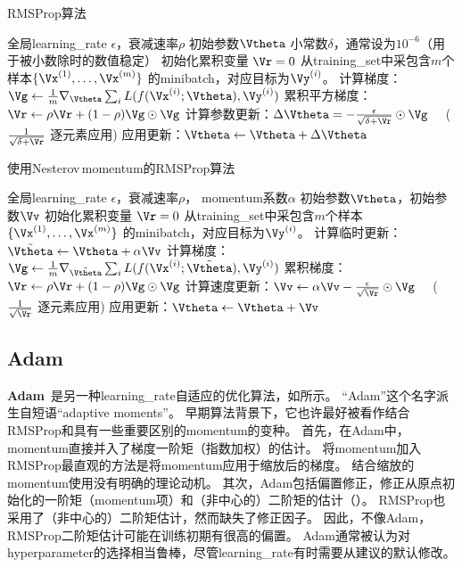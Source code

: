 \begin{algorithm}[ht]
\caption{RMSProp算法}
\label{alg:rms_prop}
\begin{algorithmic}
\REQUIRE 全局\gls{learning_rate} $\epsilon$，衰减速率$\rho$
\REQUIRE  初始参数$\Vtheta$
\REQUIRE 小常数$\delta$，通常设为$10^{-6}$（用于被小数除时的数值稳定）
\STATE 初始化累积变量 $\Vr = 0$
    \STATE 从\gls{training_set}中采包含$m$个样本$\{ \Vx^{(1)},\dots, \Vx^{(m)}\}$ 的\gls{minibatch}，对应目标为$\Vy^{(i)}$。
    \STATE 计算梯度：$\Vg \leftarrow  
         \frac{1}{m} \nabla_{\Vtheta} \sum_i L(f(\Vx^{(i)};\Vtheta),\Vy^{(i)})$ 
    \STATE 累积平方梯度：$\Vr \leftarrow \rho
    \Vr + (1-\rho) \Vg \odot \Vg$
    \STATE 计算参数更新：$\Delta \Vtheta =
    -\frac{\epsilon}{\sqrt{\delta + \Vr}} \odot \Vg$  \ \  ($\frac{1}{\sqrt{\delta + \Vr}}$ 逐元素应用)
    \STATE 应用更新：$\Vtheta \leftarrow \Vtheta + \Delta \Vtheta$
\ENDWHILE
\end{algorithmic}
\end{algorithm}

\begin{algorithm}[ht]
\caption{使用Nesterov\,\gls{momentum}的RMSProp算法}
\label{alg:rms_nesterov}
\begin{algorithmic}
\REQUIRE 全局\gls{learning_rate} $\epsilon$，衰减速率$\rho$， \gls{momentum}系数$\alpha$
\REQUIRE 初始参数$\Vtheta$，初始参数$\Vv$
\STATE 初始化累积变量 $\Vr = 0$
    \STATE 从\gls{training_set}中采包含$m$个样本$\{ \Vx^{(1)},\dots, \Vx^{(m)}\}$ 的\gls{minibatch}，对应目标为$\Vy^{(i)}$。
    \STATE 计算临时更新：$\tilde{\Vtheta} \leftarrow \Vtheta + \alpha \Vv$
    \STATE 计算梯度：$\Vg \leftarrow  
         \frac{1}{m} \nabla_{\tilde{\Vtheta}} \sum_i L(f(\Vx^{(i)};\tilde{\Vtheta}),\Vy^{(i)})$ 
    \STATE  累积梯度：$\Vr \leftarrow \rho
    \Vr + (1-\rho) \Vg \odot \Vg$
    \STATE  计算速度更新：$\Vv \leftarrow \alpha \Vv
    -\frac{\epsilon}{\sqrt{\Vr}} \odot \Vg$ \ \  ($\frac{1}{\sqrt{\Vr}}$ 逐元素应用)
    \STATE 应用更新：$\Vtheta \leftarrow \Vtheta + \Vv$
\ENDWHILE
\end{algorithmic}
\end{algorithm}


\subsection{Adam}
\label{sec:adam}
\textbf{Adam}~\citep{Kingma-Ba-2014}是另一种\gls{learning_rate}自适应的优化算法，如所示。
``Adam''这个名字派生自短语``adaptive moments''。
早期算法背景下，它也许最好被看作结合RMSProp和具有一些重要区别的\gls{momentum}的变种。
首先，在Adam中，\gls{momentum}直接并入了梯度一阶矩（指数加权）的估计。
将\gls{momentum}加入RMSProp最直观的方法是将\gls{momentum}应用于缩放后的梯度。
结合缩放的\gls{momentum}使用没有明确的理论动机。
其次，Adam包括偏置修正，修正从原点初始化的一阶矩（\gls{momentum}项）和（非中心的）二阶矩的估计（）。
RMSProp也采用了（非中心的）二阶矩估计，然而缺失了修正因子。
因此，不像Adam，RMSProp二阶矩估计可能在训练初期有很高的偏置。
Adam通常被认为对\gls{hyperparameter}的选择相当鲁棒，尽管\gls{learning_rate}有时需要从建议的默认修改。

